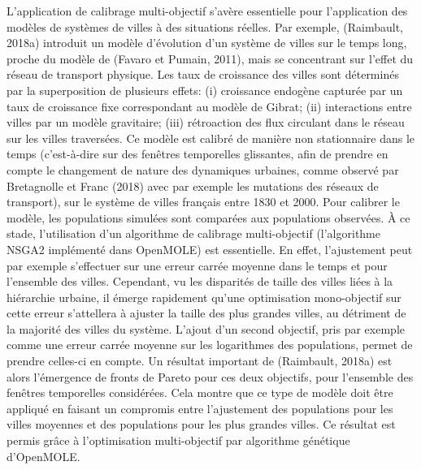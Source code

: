 \documentclass[10pt]{article}
\begin{document}
L’application de calibrage multi-objectif s'avère essentielle pour l’application des modèles de systèmes de villes à des situations réelles. Par exemple, (Raimbault, 2018a) introduit un modèle d'évolution d’un système de villes sur le temps long, proche du modèle de (Favaro et Pumain, 2011), mais se concentrant sur l’effet du réseau de transport physique. Les taux de croissance des villes sont déterminés par la superposition de plusieurs effets: (i) croissance endogène capturée par un taux de croissance fixe correspondant au modèle de Gibrat; (ii) interactions entre villes par un modèle gravitaire; (iii) rétroaction des flux circulant dans le réseau sur les villes traversées. Ce modèle est calibré de manière non stationnaire dans le temps (c’est-à-dire sur des fenêtres temporelles glissantes, afin de prendre en compte le changement de nature des dynamiques urbaines, comme observé par Bretagnolle et Franc (2018) avec par exemple les mutations des réseaux de transport), sur le système de villes français entre 1830 et 2000. Pour calibrer le modèle, les populations simulées sont comparées aux populations observées. À ce stade, l’utilisation d’un algorithme de calibrage multi-objectif (l’algorithme NSGA2 implémenté dans OpenMOLE) est essentielle. En effet, l’ajustement peut par exemple s’effectuer sur une erreur carrée moyenne dans le temps et pour l’ensemble des villes. Cependant, vu les disparités de taille des villes liées à la hiérarchie urbaine, il émerge rapidement qu’une optimisation mono-objectif sur cette erreur s'attellera à ajuster la taille des plus grandes villes, au détriment de la majorité des villes du système. L’ajout d’un second objectif, pris par exemple comme une erreur carrée moyenne sur les logarithmes des populations, permet de prendre celles-ci en compte. Un résultat important de (Raimbault, 2018a) est alors l'émergence de fronts de Pareto pour ces deux objectifs, pour l’ensemble des fenêtres temporelles considérées. Cela montre que ce type de modèle doit être appliqué en faisant un compromis entre l’ajustement des populations pour les villes moyennes et des populations pour les plus grandes villes. Ce résultat est permis grâce à l’optimisation multi-objectif par algorithme génétique d’OpenMOLE.
\end{document}
